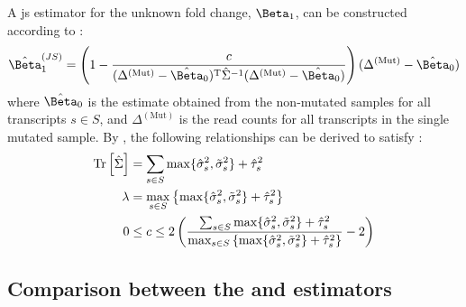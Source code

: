 A \gls{js} estimator for the unknown fold change, $\Beta_1$, can be constructed according to :
%
\begin{equation}
  \hat{\Beta}_1^{(JS)} = \left( 1 - \frac{c}{(\Delta^{(\mathrm{Mut})} - \hat{\Beta}_0)^\tran \hat{\Sigma}^{-1} (\Delta^{(\mathrm{Mut})} - \hat{\Beta}_0)} \right)(\Delta^{(\mathrm{Mut})} - \hat{\Beta}_0)
  \label{eqn:js_defn}
\end{equation}
%
where $\hat{\Beta}_0$ is the estimate obtained from the non-mutated samples for all transcripts $s \in S$, and $\Delta^{(\mathrm{Mut})}$ is the read counts for all transcripts in the single mutated sample.
By , the following relationships can be derived to satisfy :
%
\begin{align*}
  \mathrm{Tr} \left[ \hat{\Sigma} \right] & = \sum_{s \in S} \max\{ \hat{\sigma}_s^2, \tilde{\sigma}_s^2 \} + \hat{\tau}_s^2                                                                                                                                      \\
  \lambda              & = \max_{s \in S} \left\{ \max\{ \hat{\sigma}_s^2, \tilde{\sigma}_s^2 \} + \hat{\tau}_s^2 \right\}                                                                                                                     \\
  0                    & \le c \le 2 \left( \frac{\sum_{s \in S} \max\{ \hat{\sigma}_s^2, \tilde{\sigma}_s^2 \} + \hat{\tau}_s^2}{\max_{s \in S} \left\{ \max\{ \hat{\sigma}_s^2, \tilde{\sigma}_s^2 \} + \hat{\tau}_s^2 \right\}} - 2 \right) \\
\end{align*}

\subsection{Comparison between the  and  estimators}

